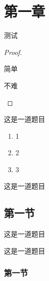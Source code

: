 \documentclass{xdyy-notes}
\begin{document}
\maketitle

\frontmatter

\begin{preface}
  \zhlipsum[1-3]
\end{preface}

\tableofcontents

\mainmatter

\chapter{第一章}

\begin{timelog}[date = {2022-02-24}]
  测试
\end{timelog}
\begin{proof}
  \begin{necessity}
    简单
  \end{necessity}

  \begin{sufficiency}
    不难
    \qedhere
  \end{sufficiency}
\end{proof}


\begin{exercise}
  这是一道题目
  \begin{enumerate}
    \item 1
    \item 2
    \item 3
  \end{enumerate}
\end{exercise}

\begin{exercise}
  这是一道题目
\end{exercise}

\section{第一节}

\begin{exercise}
  这是一道题目
\end{exercise}

\begin{exercise}
  这是一道题目
\end{exercise}

\subsection{第一节}
\end{document}
